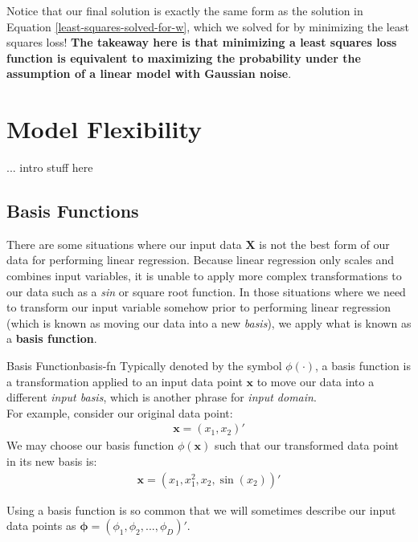 Notice that our final solution is exactly the same form as the solution in Equation \ref{least-squares-solved-for-w}, which we solved for by minimizing the least squares loss! \textbf{The takeaway here is that minimizing a least squares loss function is equivalent to maximizing the probability under the assumption of a linear model with Gaussian noise}.

\section{Model Flexibility}
... intro stuff here

\subsection{Basis Functions}
There are some situations where our input data $\textbf{X}$ is not the best form of our data for performing linear regression. Because linear regression only scales and combines input variables, it is unable to apply more complex transformations to our data such as a \textit{sin} or square root function. In those situations where we need to transform our input variable somehow prior to performing linear regression (which is known as moving our data into a new \textit{basis}), we apply what is known as a \textbf{basis function}.

\begin{definition}{Basis Function}{basis-fn}
    Typically denoted by the symbol $\phi(\cdot)$, a basis function is a transformation applied to an input data point $\textbf{x}$ to move our data into a different \textit{input basis}, which is another phrase for \textit{input domain}. \\

    For example, consider our original data point:
    \begin{align*}
        \textbf{x} = (x_{1}, x_{2})'
    \end{align*}
    We may choose our basis function $\phi(\textbf{x})$ such that our transformed data point in its new basis is:
    \begin{align*}
        \textbf{x} = (x_{1}, x_{1}^2, x_{2}, \sin(x_{2}))'
    \end{align*}

    Using a basis function is so common that we will sometimes describe our input data points as $\boldsymbol{\phi} = (\phi_{1}, \phi_{2}, ..., \phi_{D})'$.
\end{definition}

